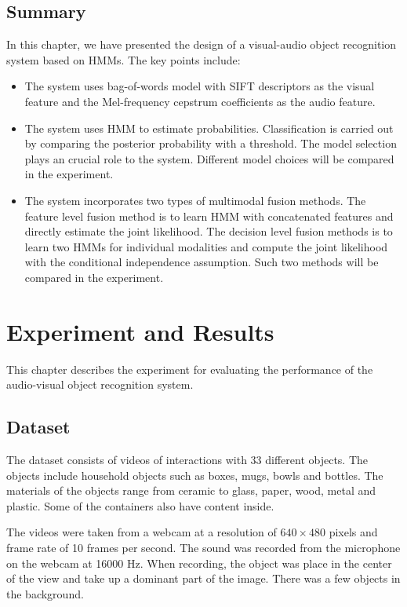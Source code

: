\documentclass[12pt,final,twoside]{report}
\theoremstyle{plain}
\theoremstyle{definition}
\theoremstyle{remark}
\begin{document}
\section{Summary}
In this chapter, we have presented the design of a visual-audio object recognition system based on HMMs. The key points include:
\begin{itemize}
  \item The system uses bag-of-words model with SIFT descriptors as the visual feature and the Mel-frequency cepstrum coefficients as the audio feature.
  \item The system uses HMM to estimate probabilities. Classification is carried out by comparing the posterior probability with a threshold. The model selection plays an crucial role to the system. Different model choices will be compared in the experiment.
  \item The system incorporates two types of multimodal fusion methods. The feature level fusion method is to learn HMM with concatenated features and directly estimate the joint likelihood. The decision level fusion methods is to learn two HMMs for individual modalities and compute the joint likelihood with the conditional independence assumption. Such two methods will be compared in the experiment.
\end{itemize}

\cleardoublepage
\chapter{Experiment and Results}
This chapter describes the experiment for evaluating the performance of the audio-visual object recognition system.

\section{Dataset}
The dataset consists of videos of interactions with 33 different objects. The objects include household objects such as boxes, mugs, bowls and bottles. The materials of the objects range from ceramic to glass, paper, wood, metal and plastic. Some of the containers also have content inside.

The videos were taken from a webcam at a resolution of $640 \times 480$ pixels and frame rate of 10 frames per second. The sound was recorded from the microphone on the webcam at 16000 Hz. When recording, the object was place in the center of the view and take up a dominant part of the image. There was a few objects in the background.
\end{document}
